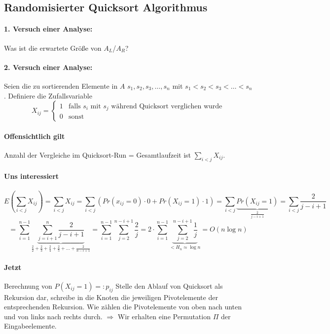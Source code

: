 \subsection{Randomisierter Quicksort Algorithmus}
\paragraph*{1. Versuch einer Analyse:} Was ist die erwartete Größe von $A_L$/$A_R$?

\paragraph*{2. Versuch einer Analyse:} Seien die zu sortierenden Elemente in $A$ $s_1,s_2,s_3,\dots,s_n$ mit $s_1<s_2<s_3<\dots<s_n$.
Definiere die Zufallsvariable
\begin{equation}
   X_{ij} =
   \begin{cases}
     1 & \text{falls } s_i \text{ mit } s_j \text{ während Quicksort verglichen wurde} \\
     0 & \text{sonst}
   \end{cases}
\end{equation}
\paragraph*{Offensichtlich gilt} Anzahl der Vergleiche im Quicksort-Run = Gesamtlaufzeit ist $\sum\limits_{i<j} X_{ij}$.

\paragraph*{Uns interessiert} $$E(\sum\limits_{i<j} X_{ij})
= \sum\limits_{i<j} X_{ij} 
= \sum\limits_{i<j}(Pr(x_{ij}=0) \cdot 0 + Pr(X_{ij}=1) \cdot 1) 
= \sum\limits_{i<j} \underbrace{Pr(X_{ij}=1)}_{\frac{2}{j-i+1}} 
= \sum\limits_{i<j} \frac{2}{j-i+1}$$
$$= \sum\limits_{i=1}^{n-1} \underbrace{\sum\limits_{j=i+1}^n \frac{2}{j-i+1}}_{\frac{2}{2}+\frac{2}{3}+\frac{2}{4}+\frac{2}{5}+\dots+\frac{2}{n-i+1}} 
= \sum\limits_{i=1}^{n-1} \sum\limits_{j=2}^{n-i+1} \frac{2}{j}
= 2 \cdot \sum\limits_{i=1}^{n-1} \underbrace{\sum\limits_{j=2}^{n-i+1} \frac{1}{j}}_{<H_n \approx \log n} 
= O(n \log n) $$

\paragraph*{Jetzt} Berechnung von $P(X_{ij}=1) =: p_{ij}$ Stelle den Ablauf von Quicksort als Rekursion dar, schreibe in die Knoten die jeweiligen Pivotelemente der entsprechenden Rekursion. Wie zählen die Pivotelemente von oben nach unten und von links nach rechts durch. $\Rightarrow$ Wir erhalten eine Permutation $\Pi$ der Eingabeelemente.

